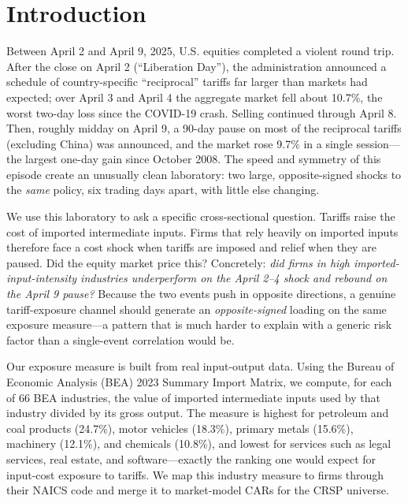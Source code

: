 \documentclass[12pt]{article}
\begin{document}
\newpage
\section{Introduction}\label{sec:intro}
Between April 2 and April 9, 2025, U.S. equities completed a violent round trip. After the
close on April 2 (``Liberation Day''), the administration announced a schedule of
country-specific ``reciprocal'' tariffs far larger than markets had expected; over April 3
and April 4 the aggregate market fell about 10.7\%, the worst two-day loss since the
COVID-19 crash. Selling continued through April 8. Then, roughly midday on April 9, a
90-day pause on most of the reciprocal tariffs (excluding China) was announced, and the
market rose 9.7\% in a single session---the largest one-day gain since October 2008. The
speed and symmetry of this episode create an unusually clean laboratory: two large,
opposite-signed shocks to the \emph{same} policy, six trading days apart, with little else
changing.

We use this laboratory to ask a specific cross-sectional question. Tariffs raise the cost
of imported intermediate inputs. Firms that rely heavily on imported inputs therefore face
a cost shock when tariffs are imposed and relief when they are paused. Did the equity
market price this? Concretely: \emph{did firms in high imported-input-intensity industries
underperform on the April 2--4 shock and rebound on the April 9 pause?} Because the two
events push in opposite directions, a genuine tariff-exposure channel should generate an
\emph{opposite-signed} loading on the same exposure measure---a pattern that is much harder
to explain with a generic risk factor than a single-event correlation would be.

Our exposure measure is built from real input-output data. Using the Bureau of Economic
Analysis (BEA) 2023 Summary Import Matrix, we compute, for each of 66 BEA industries, the
value of imported intermediate inputs used by that industry divided by its gross output.
The measure is highest for petroleum and coal products (24.7\%), motor vehicles (18.3\%),
primary metals (15.6\%), machinery (12.1\%), and chemicals (10.8\%), and lowest for
services such as legal services, real estate, and software---exactly the ranking one would
expect for input-cost exposure to tariffs. We map this industry measure to firms through
their NAICS code and merge it to market-model CARs for the CRSP universe.
\end{document}
